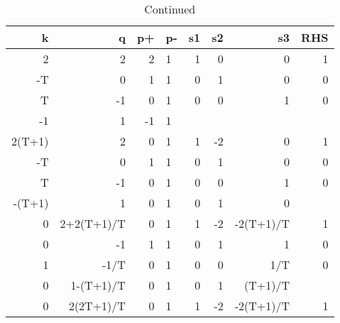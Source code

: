     \begin{table}[ht]
        \ContinuedFloat
        \caption{Continued}

        \begin{tabular}{rrrlrrrr}
        k      & q          & p+ & p- & s1        & s2         & s3          & RHS       \\ \hline
        2      & 2          & 2  & 1 & 1         & 0          & 0           & 1         \\
        -T     & 0          & 1  & 1 & 0         & 1          & 0           & 0         \\
        T      & -1         & 0  & 1 & 0         & 0          & 1           & 0         \\
        -1     & 1          & -1 & 1 &           &            &             &           \\ \hline
        2(T+1) & 2          & 0  & 1 & 1         & -2         & 0           & 1         \\ \hline
        -T     & 0          & 1  & 1 & 0         & 1          & 0           & 0         \\
        T      & -1         & 0  & 1 & 0         & 0          & 1           & 0         \\
        -(T+1) & 1          & 0  & 1 & 0         & 1          & 0           &           \\ \hline
        0      & 2+2(T+1)/T & 0  & 1 & 1         & -2         & -2(T+1)/T   & 1         \\ \hline
        0      & -1         & 1  & 1 & 0         & 1          & 1           & 0         \\
        1      & -1/T       & 0  & 1 & 0         & 0          & 1/T         & 0         \\
        0      & 1-(T+1)/T  & 0  & 1 & 0         & 1          & (T+1)/T     &           \\ \hline
        0      & 2(2T+1)/T  & 0  & 1 & 1         & -2         & -2(T+1)/T   & 1         \\ \hline

\end{tabular}
\end{table}

